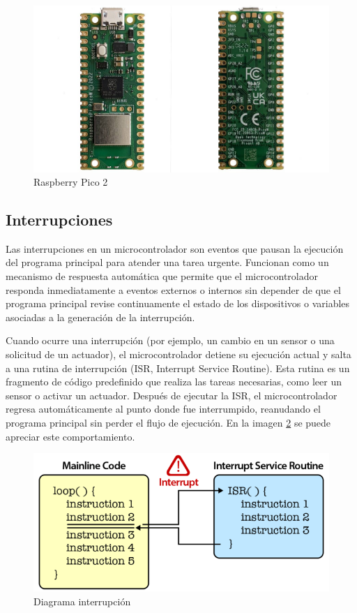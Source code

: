 \begin{figure}[h!]
	\label{raspberry}
	\centering
    \includegraphics[width=0.6\linewidth]{raspberry_pico2.jpg}
    \caption{Raspberry Pico 2}
\end{figure}


\subsection{Interrupciones}
Las interrupciones en un microcontrolador son eventos que pausan la ejecución del programa principal para atender una tarea urgente. Funcionan como un mecanismo de respuesta automática que permite que el microcontrolador responda inmediatamente a eventos externos o internos sin depender de que el programa principal revise continuamente el estado de los dispositivos o variables asociadas a la generación de la interrupción.

Cuando ocurre una interrupción (por ejemplo, un cambio en un sensor o una solicitud de un actuador), el microcontrolador detiene su ejecución actual y salta a una rutina de interrupción (ISR, Interrupt Service Routine). Esta rutina es un fragmento de código predefinido que realiza las tareas necesarias, como leer un sensor o activar un actuador. Después de ejecutar la ISR, el microcontrolador regresa automáticamente al punto donde fue interrumpido, reanudando el programa principal sin perder el flujo de ejecución. En la imagen \ref{interrupt} se puede apreciar este comportamiento.

\begin{figure}[h!]
	\label{interrupt}
	\centering
    \includegraphics[width=0.7\linewidth]{components_interrupt.png}
    \caption{Diagrama interrupción}
\end{figure}


